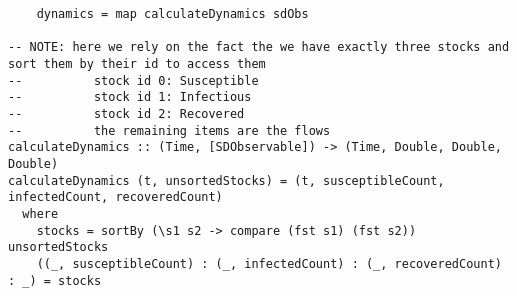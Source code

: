 \begin{verbatim}
    dynamics = map calculateDynamics sdObs
    
-- NOTE: here we rely on the fact the we have exactly three stocks and sort them by their id to access them
--          stock id 0: Susceptible
--          stock id 1: Infectious
--          stock id 2: Recovered
--          the remaining items are the flows
calculateDynamics :: (Time, [SDObservable]) -> (Time, Double, Double, Double)
calculateDynamics (t, unsortedStocks) = (t, susceptibleCount, infectedCount, recoveredCount) 
  where
    stocks = sortBy (\s1 s2 -> compare (fst s1) (fst s2)) unsortedStocks
    ((_, susceptibleCount) : (_, infectedCount) : (_, recoveredCount) : _) = stocks
\end{verbatim}